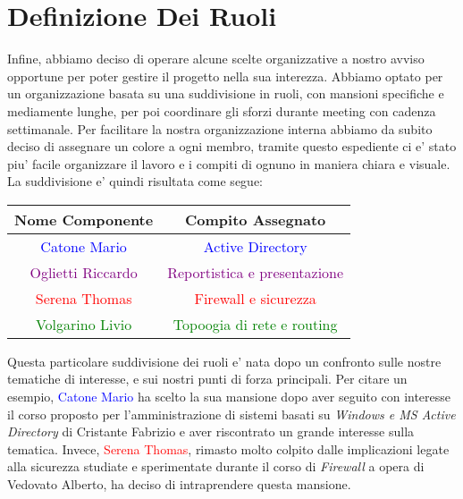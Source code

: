 \documentclass{report}
\begin{document}
        \section{Definizione Dei Ruoli}
            Infine, abbiamo deciso di operare alcune scelte organizzative a nostro avviso opportune per poter gestire il
             progetto nella sua interezza. Abbiamo optato per un organizzazione basata su una suddivisione in ruoli, con
             mansioni specifiche e mediamente lunghe, per poi coordinare gli sforzi durante meeting con cadenza settimanale.
            Per facilitare la nostra organizzazione interna abbiamo da subito deciso di assegnare un colore a ogni membro,
             tramite questo espediente ci e' stato piu' facile organizzare il lavoro e i compiti di ognuno in maniera chiara
             e visuale. 
            La suddivisione e' quindi risultata come segue:
            \begin{center}
                \begin{tabular}{ |c|c| }
                    \hline
                    Nome Componente & Compito Assegnato \\
                    \hline \hline
                    \textcolor{Blue}{Catone Mario} & \textcolor{Blue}{Active Directory} \\
                    \hline
                    \textcolor{Purple}{Oglietti Riccardo} & \textcolor{Purple}{Reportistica e presentazione} \\
                    \hline
                    \textcolor{Red}{Serena Thomas} & \textcolor{Red}{Firewall e sicurezza} \\
                    \hline
                    \textcolor{Green}{Volgarino Livio} & \textcolor{Green}{Topoogia di rete e routing} \\
                    \hline
                \end{tabular}
            \end{center}
            Questa particolare suddivisione dei ruoli e' nata dopo un confronto sulle nostre tematiche di interesse, e sui
             nostri punti di forza principali. Per citare un esempio, \textcolor{Blue}{Catone Mario} ha scelto la sua mansione
             dopo aver seguito con interesse il corso proposto per l'amministrazione di sistemi basati su \emph{Windows e MS
             Active Directory} di Cristante Fabrizio e aver riscontrato un grande interesse sulla tematica. Invece,
             \textcolor{Red}{Serena Thomas}, rimasto molto colpito dalle implicazioni legate alla sicurezza studiate e
             sperimentate durante il corso di \emph{Firewall} a opera di Vedovato Alberto, ha deciso di intraprendere
             questa mansione.
\end{document}
